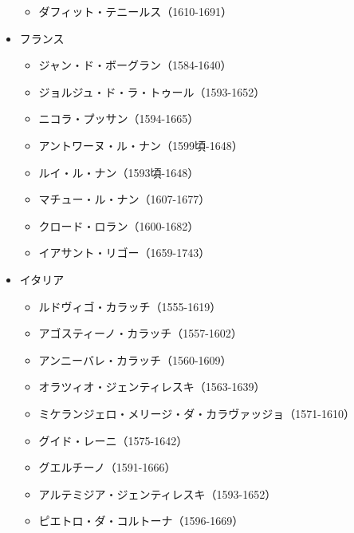 \documentclass[letterpaper,10pt,dvipdfmx]{sphinxmanual}
\begin{document}
\begin{itemize}
\begin{itemize}
\item {} 
ダフィット・テニールス（1610-1691）

\end{itemize}

\item {} 
フランス
\begin{itemize}
\item {} 
ジャン・ド・ボーグラン（1584-1640）

\item {} 
ジョルジュ・ド・ラ・トゥール（1593-1652）

\item {} 
ニコラ・プッサン（1594-1665）

\item {} 
アントワーヌ・ル・ナン（1599頃-1648）

\item {} 
ルイ・ル・ナン（1593頃-1648）

\item {} 
マチュー・ル・ナン（1607-1677）

\item {} 
クロード・ロラン（1600-1682）

\item {} 
イアサント・リゴー（1659-1743）

\end{itemize}

\item {} 
イタリア
\begin{itemize}
\item {} 
ルドヴィゴ・カラッチ（1555-1619）

\item {} 
アゴスティーノ・カラッチ（1557-1602）

\item {} 
アンニーバレ・カラッチ（1560-1609）

\item {} 
オラツィオ・ジェンティレスキ（1563-1639）

\item {} 
ミケランジェロ・メリージ・ダ・カラヴァッジョ（1571-1610）

\item {} 
グイド・レーニ（1575-1642）

\item {} 
グエルチーノ（1591-1666）

\item {} 
アルテミジア・ジェンティレスキ（1593-1652）

\item {} 
ピエトロ・ダ・コルトーナ（1596-1669）


\end{itemize}
\end{itemize}
\end{document}
